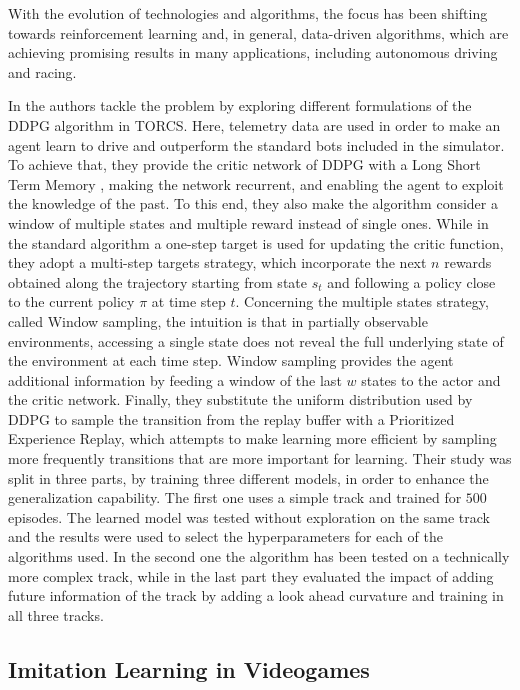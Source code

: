 With the evolution of technologies and algorithms, the focus has been shifting towards reinforcement learning and, in general, data-driven algorithms, which are achieving promising results in many applications, including autonomous driving and racing. 

In \cite{formularl} the authors tackle the problem by exploring different formulations of the DDPG algorithm \cite{ddpg} in TORCS.
Here, telemetry data are used in order to make an agent learn to drive and outperform the standard bots included in the simulator.
To achieve that, they provide the critic network of DDPG with a Long Short Term Memory \cite{lstm}, making the network recurrent, and enabling the agent to exploit the knowledge of the past. To this end, they also make the algorithm consider a window of multiple states and multiple reward instead of single ones.
While in the standard algorithm a one-step target is used for updating the critic function, they adopt a multi-step targets strategy, which incorporate the next $n$ rewards obtained along the trajectory starting from state $s_t$ and following a policy close to the current policy \(\pi\) at time step $t$.
Concerning the multiple states strategy, called Window sampling, the intuition is that in partially observable environments, accessing a single state does not reveal the full underlying state of the environment at each time step. Window sampling provides the agent additional information by feeding a window of the last $w$ states to the actor and the critic network.
Finally, they substitute the uniform distribution used by DDPG to sample the transition from the replay buffer with a Prioritized Experience Replay, which attempts to make learning more efficient by sampling more frequently transitions that are more important for learning.
Their study was split in three parts, by training three different models, in order to enhance the generalization capability. The first one uses a simple track and trained for $500$ episodes. The learned model was tested without exploration on the same track and the results were used to select the hyperparameters for each of the algorithms used. In the second one the algorithm has been tested on a technically more complex track, while in the last part they evaluated the impact of adding future information of the track by adding a look ahead curvature and training in all three tracks.


\subsection{Imitation Learning in Videogames}

